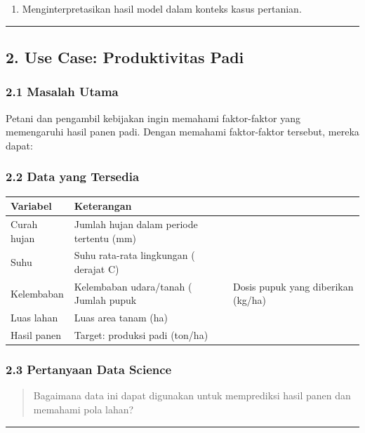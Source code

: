 \documentclass[12pt,a4paper]{article}
\begin{document}
\begin{enumerate}
\item Menginterpretasikan hasil model dalam konteks kasus pertanian.
\end{enumerate}


\hrule


\subsection{2. Use Case: Produktivitas Padi}

\subsubsection{2.1 Masalah Utama}

Petani dan pengambil kebijakan ingin memahami faktor-faktor yang memengaruhi hasil panen padi. Dengan memahami faktor-faktor tersebut, mereka dapat:



\subsubsection{2.2 Data yang Tersedia}

\begin{tabular}{|l|l|}
\hline
Variabel & Keterangan \\
\hline
Curah hujan & Jumlah hujan dalam periode tertentu (mm) \\
\hline
Suhu & Suhu rata-rata lingkungan ( derajat C) \\
\hline
Kelembaban & Kelembaban udara/tanah (%
\hline
Jumlah pupuk & Dosis pupuk yang diberikan (kg/ha) \\
\hline
Luas lahan & Luas area tanam (ha) \\
\hline
Hasil panen & Target: produksi padi (ton/ha) \\
\hline
\end{tabular}


\subsubsection{2.3 Pertanyaan Data Science}

\begin{quote}
Bagaimana data ini dapat digunakan untuk memprediksi hasil panen dan memahami pola lahan?\end{quote}


\hrule
\end{document}
